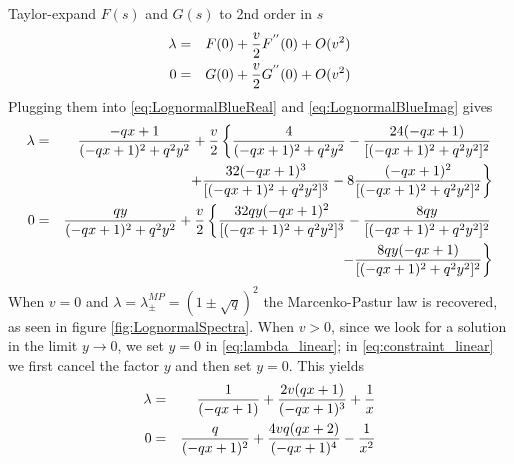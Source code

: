 \documentclass{article}
\begin{document}
Taylor-expand $F(s)$ and $G(s)$ to 2nd order in $s$
\begin{eqnarray*}
\lambda &=& F(0) + {v \over 2}F^{''}(0) + O(v^2) \\
0 &=& G(0) + {v \over 2}G^{''}(0) + O(v^2) \\
\end{eqnarray*}
Plugging them into \eqref{eq:LognormalBlueReal} and
\eqref{eq:LognormalBlueImag} gives
\begin{eqnarray}
\lambda &=& {-q x+1 \over (-q x+1)^2+q^2 y^2} + {v \over 2}\left\{
{4 \over (-q x+1)^2+q^2 y^2} -{24 (-q x+1) \over
  [(-q x+1)^2+q^2 y^2]^2} \right. \nonumber \\
&& \left. + {32 (-q x+1)^3 \over [(-q x+1)^2+q^2 y^2]^3} -8 {(-q
    x+1)^2 \over [(-q x+1)^2+q^2 y^2]^2}
\right\} \label{eq:lambda_linear}\\
0 &=& {q y \over (-q x+1)^2+q^2 y^2} + {v \over 2} \left\{
  {32 q y (-q x+1)^2 \over [(-q x+1)^2+q^2 y^2]^3}
  -{8 q y \over [(-q x+1)^2+q^2 y^2]^2} \right. \nonumber \\
  && \left.
    -{8 q y (-q x+1) \over [(-q x+1)^2+q^2 y^2]^2}
\right\} \label{eq:constraint_linear}
\end{eqnarray}
When $v = 0$ and $\lambda = \lambda^{MP}_{\pm} = (1 \pm
\sqrt{q})^2$ the Marcenko-Pastur law is recovered, as seen in figure
\ref{fig:LognormalSpectra}. When $v > 0$, since we look for a solution
in the limit $y \to 0$, we set $y = 0$ in \eqref{eq:lambda_linear}; in
\eqref{eq:constraint_linear} we first cancel the factor $y$ and then
set $y = 0$. This yields
\begin{eqnarray}
  \lambda &=& {1 \over (-q x+1)} + {2 v (q x+1) \over (-q x+1)^3} + {1
    \over x} \label{eq:lambda_1} \\
  0 &=& {q \over (-q x+1)^2} + {4 v q(q x+2) \over (-q x+1)^4} - {1
    \over x^2} \label{eq:constraint_1}
\end{eqnarray}
\end{document}
